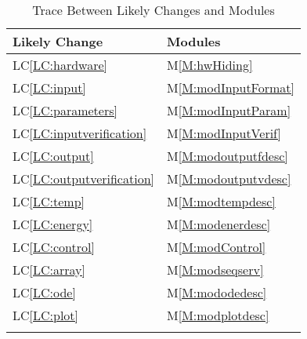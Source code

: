 \documentclass[12pt]{article}
\begin{document}
\begin{longtable}{l l}
\toprule
Likely Change & Modules
\\
\midrule
LC\ref{LC:hardware} & M\ref{M:hwHiding}
\\
LC\ref{LC:input} & M\ref{M:modInputFormat}
\\
LC\ref{LC:parameters} & M\ref{M:modInputParam}
\\
LC\ref{LC:inputverification} & M\ref{M:modInputVerif}
\\
LC\ref{LC:output} & M\ref{M:modoutputfdesc}
\\
LC\ref{LC:outputverification} & M\ref{M:modoutputvdesc}
\\
LC\ref{LC:temp} & M\ref{M:modtempdesc}
\\
LC\ref{LC:energy} & M\ref{M:modenerdesc}
\\
LC\ref{LC:control} & M\ref{M:modControl}
\\
LC\ref{LC:array} & M\ref{M:modseqserv}
\\
LC\ref{LC:ode} & M\ref{M:mododedesc}
\\
LC\ref{LC:plot} & M\ref{M:modplotdesc}
\\
\bottomrule
\caption{Trace Between Likely Changes and Modules}
\label{Table:TracBetwLikeChanandModu}
\end{longtable}
\end{document}
